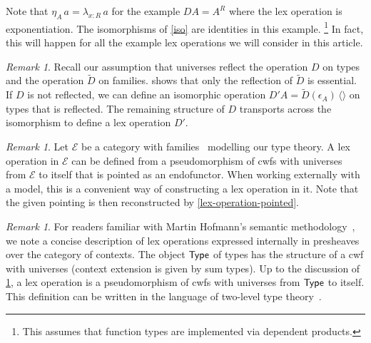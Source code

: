 \documentclass[10pt,a4paper,draft]{article}
\def\Type{\hbox{\sf Type}}
\newcommand{\Unit}{\mathbf{1}}
\newcommand{\UU}{\mathcal{U}}%
\newcommand{\id}{\mathsf{id}}
\newcommand{\unitF}{\langle \rangle}
\newcommand{\D}{D}              %
\newcommand{\DD}{\tilde{D}} %
\renewcommand{\~}{\widetilde}
\theoremstyle{definition}
\theoremstyle{remark} %
\newtheorem{remark}[theorem]{Remark}
\begin{document}


\medskip

Note that $\eta_A\,a = \lambda_{x:R}\,a$ for the example $\D A = A^R$
where the lex operation is exponentiation.
The isomorphisms of \cref{iso} are identities in this example.%
\footnote{This assumes that function types are implemented via dependent products.}
In fact, this will happen for all the example lex operations we will consider in this article.

\begin{remark} \label{D-reflection}
Recall our assumption that universes reflect the operation $\D$ on types and the operation $\DD$ on families.
 shows that only the reflection of $\DD$ is essential.
If $\D$ is not reflected, we can define an isomorphic operation $\D' A = \DD (\epsilon_A)\, \unitF$ on types that is reflected.
The remaining structure of $\D$ transports across the isomorphism to define a lex operation $\D'$.
\end{remark}

\begin{remark}
Let $\mathcal{E}$ be a category with families~\cite{Dybjer95} modelling our type theory.
A lex operation in $\mathcal{E}$ can be defined from a pseudomorphism of cwfs with universes~\cite{KaposiHS19} from $\mathcal{E}$ to itself that is pointed as an endofunctor.
When working externally with a model, this is a convenient way of constructing a lex operation in it.
Note that the given pointing is then reconstructed by \cref{lex-operation-pointed}.
\end{remark}

\begin{remark}
For readers familiar with Martin Hofmann's semantic methodology~\cite{Hofmann97}, we note a concise description of lex operations expressed internally in presheaves over the category of contexts.
The object $\Type$ of types has the structure of a cwf with universes (context extension is given by sum types).
Up to the discussion of \cref{D-reflection}, a lex operation is a pseudomorphism of cwfs with universes from $\Type$ to itself.
This definition can be written in the language of two\hyp{}level type theory~\cite{AnnenkovCKS17}.
\end{remark}
\end{document}
